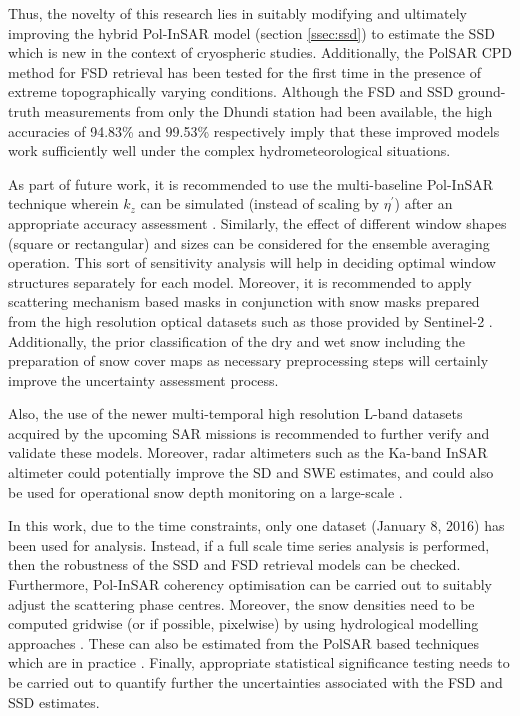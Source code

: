 \documentclass[review]{elsarticle}
\numberwithin{equation}{section}
\numberwithin{figure}{section}
\numberwithin{table}{section}
\begin{document}
Thus, the novelty of this research lies in suitably modifying and ultimately improving the hybrid Pol-InSAR model (section \ref{ssec:ssd}) to estimate the SSD which is new in the context of cryospheric studies. Additionally, the PolSAR CPD method for FSD retrieval has been tested for the first time in the presence of extreme topographically varying conditions. Although the FSD and SSD ground-truth measurements from only the Dhundi station had been available, the high accuracies of 94.83\% and 99.53\% respectively imply that these improved models work sufficiently well under the complex hydrometeorological situations.

As part of future work, it is recommended to use the multi-baseline Pol-InSAR technique \citep{Cloude2010} wherein $k_z$ can be simulated (instead of scaling by $\eta^\prime$) after an appropriate accuracy assessment \citep{Kumar2017}. Similarly, the effect of different window shapes (square or rectangular) and sizes can be considered for the ensemble averaging operation. This sort of sensitivity analysis will help in deciding optimal window structures separately for each model. Moreover, it is recommended to apply scattering mechanism based masks in conjunction with snow masks prepared from the high resolution optical datasets such as those provided by Sentinel-2 \citep{Zhu2015}. Additionally, the prior classification of the dry and wet snow including the preparation of snow cover maps \citep{Leinss2018, Thakur2012, Zhu2015} as necessary preprocessing steps will certainly improve the uncertainty assessment process.

Also, the use of the newer multi-temporal high resolution L-band datasets acquired by the upcoming SAR missions \citep{Krieger2016, Rosen2017} is recommended to further verify and validate these models. Moreover, radar altimeters such as the Ka-band InSAR altimeter could potentially improve the SD and SWE estimates, and could also be used for operational snow depth monitoring on a large-scale \citep{Hensley2016, Kim2018, Moller2011, Speziali2018}.

In this work, due to the time constraints, only one dataset (January 8, 2016) has been used for analysis. Instead, if a full scale time series analysis is performed, then the robustness of the SSD and FSD retrieval models can be checked. Furthermore, Pol-InSAR coherency optimisation can be carried out to suitably adjust the scattering phase centres\citep{Cloude2005, Cloude2010}. Moreover, the snow densities need to be computed gridwise (or if possible, pixelwise) by using hydrological modelling approaches \citep{Bartelt2002, Liang1994}. These can also be estimated from the PolSAR based techniques which are in practice \citep{Singh2017, Thakur2012}. Finally, appropriate statistical significance testing needs to be carried out to quantify further the uncertainties associated with the FSD and SSD estimates.
\end{document}
